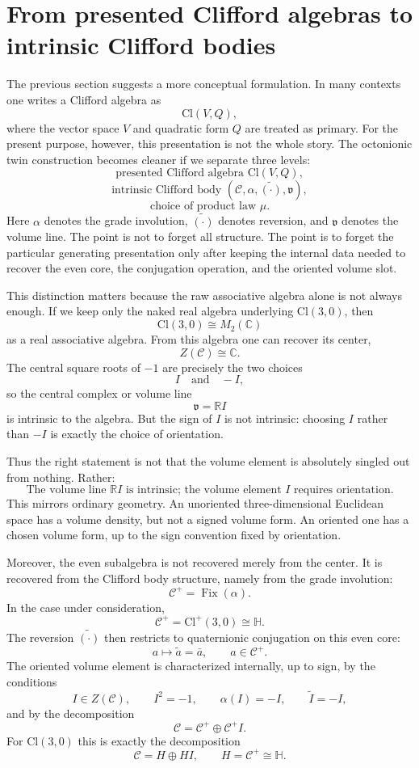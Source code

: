 \documentclass[11pt]{article}
\newcommand{\Cl}{\mathrm{Cl}}
\begin{document}
\section{From presented Clifford algebras to intrinsic Clifford bodies}

The previous section suggests a more conceptual formulation. In many contexts
one writes a Clifford algebra as
\[
\Cl(V,Q),
\]
where the vector space $V$ and quadratic form $Q$ are treated as primary.
For the present purpose, however, this presentation is not the whole story.
The octonionic twin construction becomes cleaner if we separate three levels:
\[
\text{presented Clifford algebra } \Cl(V,Q),
\]
\[
\text{intrinsic Clifford body } (\mathcal C,\alpha,\widetilde{(\cdot)},\mathfrak v),
\]
\[
\text{choice of product law } \mu.
\]
Here $\alpha$ denotes the grade involution, $\widetilde{(\cdot)}$ denotes
reversion, and $\mathfrak v$ denotes the volume line. The point is not to
forget all structure. The point is to forget the particular generating
presentation only after keeping the internal data needed to recover the even
core, the conjugation operation, and the oriented volume slot.

This distinction matters because the raw associative algebra alone is not
always enough. If we keep only the naked real algebra underlying $\Cl(3,0)$,
then
\[
\Cl(3,0)\cong M_2(\mathbb C)
\]
as a real associative algebra. From this algebra one can recover its center,
\[
Z(\mathcal C)\cong \mathbb C.
\]
The central square roots of $-1$ are precisely the two choices
\[
I \quad\text{and}\quad -I,
\]
so the central complex or volume line
\[
\mathfrak v=\mathbb R I
\]
is intrinsic to the algebra. But the sign of $I$ is not intrinsic: choosing
$I$ rather than $-I$ is exactly the choice of orientation.

Thus the right statement is not that the volume element is absolutely singled
out from nothing. Rather:
\[
\boxed{
\text{The volume line }\mathbb RI\text{ is intrinsic; the volume element }I
\text{ requires orientation.}
}
\]
This mirrors ordinary geometry. An unoriented three-dimensional Euclidean
space has a volume density, but not a signed volume form. An oriented one has
a chosen volume form, up to the sign convention fixed by orientation.

Moreover, the even subalgebra is not recovered merely from the center. It is
recovered from the Clifford body structure, namely from the grade involution:
\[
\mathcal C^+=\operatorname{Fix}(\alpha).
\]
In the case under consideration,
\[
\mathcal C^+=\Cl^+(3,0)\cong\mathbb H.
\]
The reversion $\widetilde{(\cdot)}$ then restricts to quaternionic conjugation
on this even core:
\[
a\mapsto \widetilde a=\bar a,
\qquad a\in \mathcal C^+.
\]
The oriented volume element is characterized internally, up to sign, by the
conditions
\[
I\in Z(\mathcal C),
\qquad
I^2=-1,
\qquad
\alpha(I)=-I,
\qquad
\widetilde I=-I,
\]
and by the decomposition
\[
\mathcal C=\mathcal C^+\oplus \mathcal C^+I.
\]
For $\Cl(3,0)$ this is exactly the decomposition
\[
\mathcal C=H\oplus HI,
\qquad H=\mathcal C^+\cong\mathbb H.
\]
\end{document}
